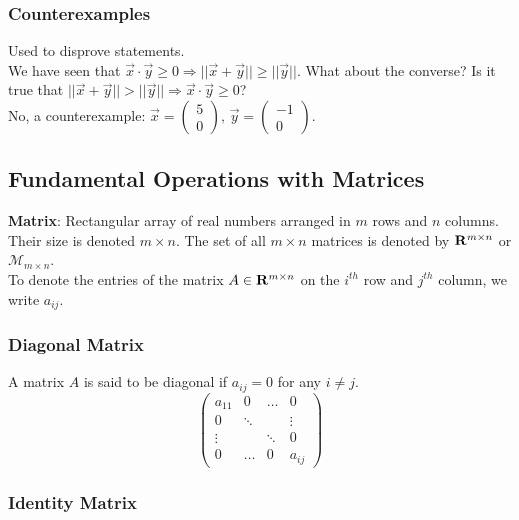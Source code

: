 \documentclass{article}
\begin{document}
	\subsubsection*{Counterexamples}
	
	Used to disprove statements. \\
	
	We have seen that $ \vec{x} \cdot \vec{y} \geq 0 \Rightarrow ||\vec{x} + \vec{y}|| \geq ||\vec{y}|| $. What about the converse? Is it true that $ ||\vec{x} + \vec{y}|| > ||\vec{y}|| \Rightarrow \vec{x} \cdot \vec{y} \geq 0 $? \\
	
	No, a counterexample: $ \vec{x} = \begin{pmatrix} 5 \\0 \end{pmatrix}, \, \vec{y} = \begin{pmatrix} -1\\0 \end{pmatrix} $.
	
\subsection{Fundamental Operations with Matrices}

	\textbf{Matrix}: Rectangular array of real numbers arranged in $ m $ rows and $ n $ columns. Their size is denoted $ m \times n $. The set of all $ m \times n $ matrices is denoted by $ \mathbf{R}^{m \times n} $ or $ \mathcal{M}_{m \times n} $. \\
	
	To denote the entries of the matrix $ A \in \mathbf{R}^{m \times n} $ on the $ i^{th} $ row and $ j^{th} $ column, we write $ a_{ij} $.
	
	\subsubsection*{Diagonal Matrix}
	
	A matrix $ A $ is said to be diagonal if $ a_{ij} = 0 $ for any $ i \neq j $.
	\[
		\begin{pmatrix}
			a_{11} & 0      & \dots  & 0      \\
			0      & \ddots &        & \vdots \\
			\vdots &        & \ddots & 0      \\
			0      & \dots  & 0      & a_{ij}
		\end{pmatrix}
	\]
	
	\subsubsection*{Identity Matrix}
	
\end{document}

